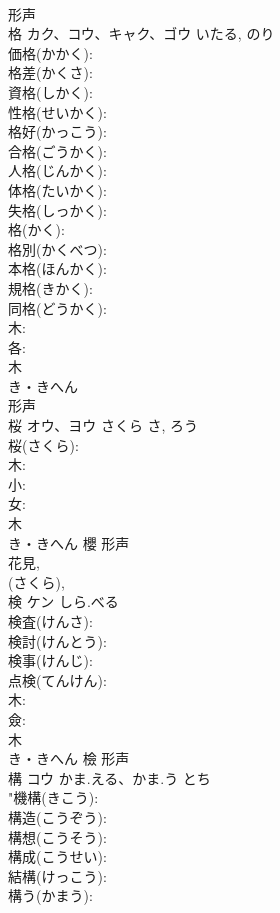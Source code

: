 \documentclass[8pt]{extreport}
\begin{document}
\begin{CJK}{UTF8}{min}
\\	形声 
\\	格	カク、コウ、キャク、ゴウ		いたる, のり	
\\	価格(かかく): 
\\	格差(かくさ): 
\\	資格(しかく): 
\\	性格(せいかく): 
\\	格好(かっこう): 
\\	合格(ごうかく): 
\\	人格(じんかく): 
\\	体格(たいかく): 
\\	失格(しっかく): 
\\	格(かく): 
\\	格別(かくべつ): 
\\	本格(ほんかく): 
\\	規格(きかく): 
\\	同格(どうかく): 
\\	木: 
\\	各: 
\\	木	
\\	き・きへん	
\\	形声 
\\	桜	オウ、ヨウ	さくら	さ, ろう	
\\	桜(さくら): 
\\	木: 
\\	小: 
\\	女: 
\\	木	
\\	き・きへん	櫻	形声 
\\	花見, 
\\	(さくら), 
\\	検	ケン	しら.べる		
\\	検査(けんさ): 
\\	検討(けんとう): 
\\	検事(けんじ): 
\\	点検(てんけん): 
\\	木: 
\\	僉: 
\\	木	
\\	き・きへん	檢	形声 
\\	構	コウ	かま.える、かま.う	とち	
\\	"機構(きこう): 
\\	構造(こうぞう): 
\\	構想(こうそう): 
\\	構成(こうせい): 
\\	結構(けっこう): 
\\	構う(かまう): 

\end{CJK}
\end{document}
